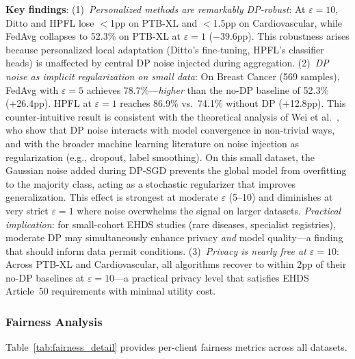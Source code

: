 \documentclass[conference]{IEEEtran}
\begin{document}
\textbf{Key findings}: (1)~\textit{Personalized methods are remarkably DP-robust}: At $\varepsilon{=}10$, Ditto and HPFL lose $<$1pp on PTB-XL and $<$1.5pp on Cardiovascular, while FedAvg collapses to 52.3\% on PTB-XL at $\varepsilon{=}1$ ($-$39.6pp). This robustness arises because personalized local adaptation (Ditto's fine-tuning, HPFL's classifier heads) is unaffected by central DP noise injected during aggregation.
(2)~\textit{DP noise as implicit regularization on small data}: On Breast Cancer (569 samples), FedAvg with $\varepsilon{=}5$ achieves 78.7\%---\textit{higher} than the no-DP baseline of 52.3\% (+26.4pp). HPFL at $\varepsilon{=}1$ reaches 86.9\% vs.\ 74.1\% without DP (+12.8pp). This counter-intuitive result is consistent with the theoretical analysis of Wei et al.~\cite{wei2020federated}, who show that DP noise interacts with model convergence in non-trivial ways, and with the broader machine learning literature on noise injection as regularization (e.g., dropout, label smoothing). On this small dataset, the Gaussian noise added during DP-SGD prevents the global model from overfitting to the majority class, acting as a stochastic regularizer that improves generalization. This effect is strongest at moderate $\varepsilon$ (5--10) and diminishes at very strict $\varepsilon{=}1$ where noise overwhelms the signal on larger datasets. \textit{Practical implication}: for small-cohort EHDS studies (rare diseases, specialist registries), moderate DP may simultaneously enhance privacy \textit{and} model quality---a finding that should inform data permit conditions.
(3)~\textit{Privacy is nearly free at $\varepsilon{=}10$}: Across PTB-XL and Cardiovascular, all algorithms recover to within 2pp of their no-DP baselines at $\varepsilon{=}10$---a practical privacy level that satisfies EHDS Article~50 requirements with minimal utility cost.

\subsubsection{Fairness Analysis}

Table~\ref{tab:fairness_detail} provides per-client fairness metrics across all datasets.
\end{document}
